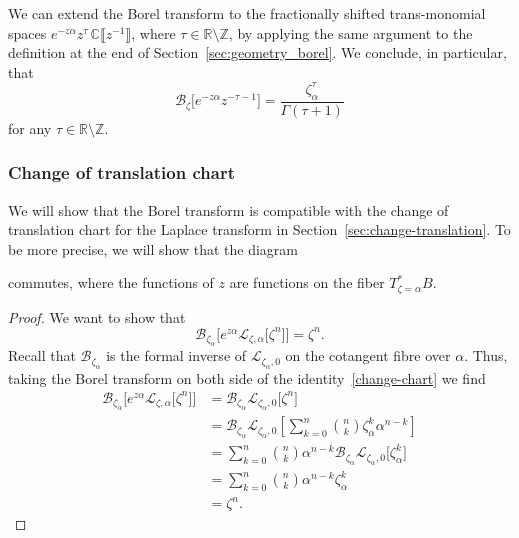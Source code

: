 \documentclass{article}
\newcommand{\Z}{\mathbb{Z}}
\newcommand{\R}{\mathbb{R}}
\newcommand{\C}{\mathbb{C}}
\newcommand{\laplace}{\mathcal{L}}
\newcommand{\borel}{\mathcal{B}}
\theoremstyle{definition}
\theoremstyle{plain}
\begin{document}
We can extend the Borel transform to the fractionally shifted trans-monomial spaces $e^{-z\alpha} z^\tau\,\C\llbracket z^{-1} \rrbracket$, where $\tau \in \R \setminus \Z$, by applying the same argument to the definition at the end of Section~\ref{sec:geometry_borel}. We conclude, in particular, that
\[\borel_{\zeta}\big[e^{-z\alpha}z^{-\tau-1}\big] = \frac{\zeta_\alpha^\tau}{\Gamma(\tau+1)}\]
for any $\tau \in \R\setminus\Z$.

\subsubsection{Change of translation chart}\label{transl-borel}
We will show that the Borel transform is compatible with the change of translation chart for the Laplace transform in Section~\ref{sec:change-translation}. To be more precise, we will show that the diagram
\begin{center}
\end{center}
commutes, where the functions of $z$ are functions on the fiber $T^*_{\zeta=\alpha}B$. 
\begin{proof}
We want to show that 
\[\borel_{\zeta_\alpha}\Big[e^{z\alpha} \laplace_{\zeta,\alpha}\big[\zeta^n\big]\Big]=\zeta^n.\]
Recall that $\borel_{\zeta_\alpha}$
is the formal inverse of $\laplace_{\zeta_\alpha,0}$ on the cotangent fibre over $\alpha$. Thus, taking the Borel transform on both side of the identity~\eqref{change-chart} we find
  \begin{align*}
      \borel_{\zeta_\alpha}\Big[e^{z\alpha} \laplace_{\zeta,\alpha}\big[\zeta^n\big]\Big]&=\borel_{\zeta_\alpha}\laplace_{\zeta_\alpha,0}\big[\zeta^n\big]\\
      &=\borel_{\zeta_\alpha}\laplace_{\zeta_\alpha,0}\left[\sum_{k=0}^n{n\choose k}\zeta_\alpha^k \alpha^{n-k}\right]\\
      &=\sum_{k=0}^n{n\choose k} \alpha^{n-k}\borel_{\zeta_\alpha}\laplace_{\zeta_\alpha,0}\big[\zeta_\alpha^k \big]\\
      &=\sum_{k=0}^n{n\choose k} \alpha^{n-k}\zeta_\alpha^k\\
      &=\zeta^n.
  \end{align*}
\end{proof}
%
\end{document}
